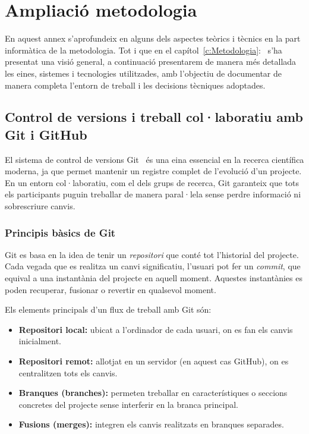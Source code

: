 \chapter{Ampliació metodologia}
\label{a:metodologia_informàtica}

En aquest annex s’aprofundeix en alguns dels aspectes teòrics i tècnics  en la part informàtica de la metodologia. Tot i que en el capítol~\ref{c:Metodologia}:~ s’ha presentat una visió general, a continuació presentarem de manera més detallada les eines, sistemes i tecnologies utilitzades, amb l’objectiu de documentar de manera completa l’entorn de treball i les decisions tècniques adoptades.

\section{Control de versions i treball col·laboratiu amb Git i GitHub}
El sistema de control de versions Git~\cite{git} és una eina essencial en la recerca científica moderna, ja que permet mantenir un registre complet de l’evolució d’un projecte. En un entorn col·laboratiu, com el dels grups de recerca, Git garanteix que tots els participants puguin treballar de manera paral·lela sense perdre informació ni sobrescriure canvis.

\subsection{Principis bàsics de Git}
Git es basa en la idea de tenir un \textit{repositori} que conté tot l’historial del projecte. Cada vegada que es realitza un canvi significatiu, l’usuari pot fer un \textit{commit}, que equival a una instantània del projecte en aquell moment. Aquestes instantànies es poden recuperar, fusionar o revertir en qualsevol moment.

Els elements principals d’un flux de treball amb Git són:
\begin{itemize}
  \item \textbf{Repositori local:} ubicat a l’ordinador de cada usuari, on es fan els canvis inicialment.
  \item \textbf{Repositori remot:} allotjat en un servidor (en aquest cas GitHub), on es centralitzen tots els canvis.
  \item \textbf{Branques (branches):} permeten treballar en característiques o seccions concretes del projecte sense interferir en la branca principal.
  \item \textbf{Fusions (merges):} integren els canvis realitzats en branques separades.
\end{itemize}


